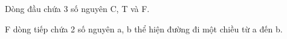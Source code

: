 Dòng đầu chứa 3 số nguyên C, T và F.  

   F dòng tiếp chứa 2 số nguyên a, b thể hiện đường đi một chiều từ a đến b.